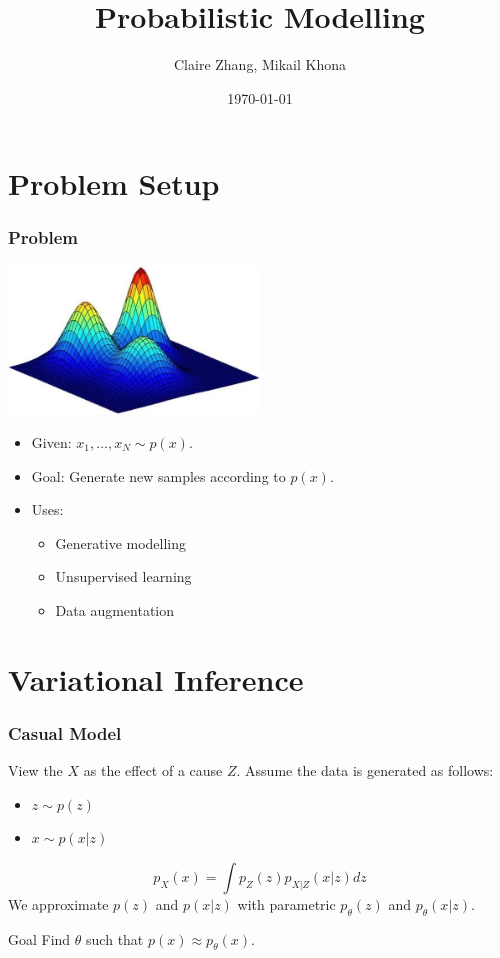 \documentclass{beamer}
\title{Probabilistic Modelling}
\author{Claire Zhang, Mikail Khona}
\date{\today}
\begin{document}
\begin{frame}
  \titlepage
\end{frame}


\section{Problem Setup}
\begin{frame}
    \frametitle{Problem}
    \begin{center}
        \includegraphics[width=0.5\textwidth]{images/gmix.jpg}
    \end{center}
    \begin{itemize}
    \item Given: $x_1, \ldots, x_N \sim p(x)$.
    \item Goal: Generate new samples according to $p(x)$.
    \item Uses:
        \begin{itemize}
            \item Generative modelling
            \item Unsupervised learning
            \item Data augmentation
        \end{itemize}
    \end{itemize}
\end{frame}

\section{Variational Inference}

\begin{frame}
\frametitle{Casual Model}
View the $X$ as the effect of a cause $Z$. Assume the data is generated as follows:

    \begin{itemize}
    \item $z \sim p(z)$
    \item $x \sim p(x|z)$
    \end{itemize}
    \[p_X(x) = \int p_Z(z) p_{X | Z}(x|z) dz\]
    We approximate $p(z)$ and $p(x|z)$ with parametric $p_{\theta}(z)$ and $p_{\theta}(x|z)$.

    \begin{block}{Goal}
        Find $\theta$ such that $p(x) \approx p_{\theta}(x)$.
    \end{block}
\end{frame}
\end{document}
